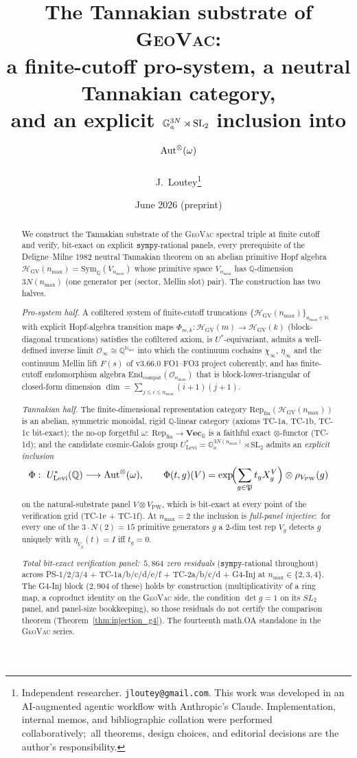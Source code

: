 \documentclass[11pt,a4paper]{article}
\title{The Tannakian substrate of \textsc{GeoVac}:\\
a finite-cutoff pro-system, a neutral Tannakian category,\\
and an explicit $\Ga^{3N} \rtimes \SL_{2}$ inclusion into $\Aut^{\otimes}(\fibfun)$}
\author{J.~Loutey\thanks{Independent researcher. \texttt{jloutey@gmail.com}.
This work was developed in an AI-augmented agentic workflow with
Anthropic's Claude. Implementation, internal memos, and bibliographic
collation were performed collaboratively;\ all theorems, design
choices, and editorial decisions are the author's responsibility.}}
\date{June 2026 (preprint)}
\theoremstyle{plain}
\theoremstyle{definition}
\newcommand{\nmax}{n_{\max}}
\newcommand{\HGV}{\mathcal{H}_{\mathrm{GV}}}
\newcommand{\Oh}{\mathcal{O}}
\newcommand{\Ginf}{\mathcal{O}_{\infty}}
\newcommand{\Repcat}{\mathrm{Rep}_{\mathrm{fin}}}
\newcommand{\Aut}{\mathrm{Aut}}
\newcommand{\End}{\mathrm{End}}
\newcommand{\Sym}{\mathrm{Sym}}
\newcommand{\SL}{\mathrm{SL}}
\newcommand{\Ga}{\mathbb{G}_{a}}
\newcommand{\Vecbf}{\mathbf{Vec}}
\newcommand{\Q}{\mathbb{Q}}
\newcommand{\N}{\mathbb{N}}
\newcommand{\Ulev}{U^{*}_{\mathrm{Levi}}}
\newcommand{\Ustar}{U^{*}}
\newcommand{\Phimap}{\Phi}
\newcommand{\fibfun}{\omega}
\begin{document}
\maketitle

\begin{abstract}
We construct the Tannakian substrate of the \textsc{GeoVac} spectral
triple at finite cutoff and verify, bit-exact on explicit
$\texttt{sympy}$-rational panels, every prerequisite of the Deligne--Milne
1982 neutral Tannakian theorem on an abelian primitive Hopf algebra
$\HGV(\nmax) = \Sym_{\Q}(V_{\nmax})$ whose primitive space $V_{\nmax}$
has $\Q$-dimension $3 N(\nmax)$ (one generator per (sector, Mellin slot)
pair). The construction has two halves.

\medskip
\noindent\emph{Pro-system half.} A cofiltered system of finite-cutoff
truncations $\{\HGV(\nmax)\}_{\nmax\in\N}$ with explicit Hopf-algebra
transition maps $\Phi_{m, k} : \HGV(m) \to \HGV(k)$ (block-diagonal
truncations) satisfies the cofiltered axiom, is $\Ustar$-equivariant,
admits a well-defined inverse limit $\Ginf \cong \Q^{\N_{\mathrm{sec}}}$
into which the continuum cochains $\chi_{\infty}$, $\eta_{\infty}$ and
the continuum Mellin lift $F(s)$ of v3.66.0 FO1--FO3 project
coherently, and has finite-cutoff endomorphism algebra
$\End_{\mathrm{compat}}(\Oh_{\nmax})$ that is block-lower-triangular of
closed-form dimension $\dim = \sum_{j \le i \le \nmax}(i + 1)(j + 1)$.

\medskip
\noindent\emph{Tannakian half.} The finite-dimensional
representation category $\Repcat(\HGV(\nmax))$ is an abelian, symmetric
monoidal, rigid $\Q$-linear category (axioms TC-1a, TC-1b, TC-1c
bit-exact); the no-op forgetful $\fibfun :\ \Repcat \to \Vecbf_{\Q}$ is a
faithful exact $\otimes$-functor (TC-1d); and the candidate
cosmic-Galois group $\Ulev = \Ga^{3 N(\nmax)} \rtimes \SL_{2}$
admits an \emph{explicit inclusion}
\[
   \Phimap :\ \Ulev(\Q) \longrightarrow \Aut^{\otimes}(\fibfun),
   \qquad
   \Phimap(t, g)(V) = \exp\!\Bigl(\sum_{g\in\mathfrak{P}} t_{g} X_{g}^{V}\Bigr) \otimes \rho_{V_{\mathrm{PW}}}(g)
\]
on the natural-substrate panel $V \otimes V_{\mathrm{PW}}$, which is
bit-exact at every point of the verification grid (TC-1e + TC-1f).
At $\nmax = 2$ the inclusion is \emph{full-panel injective}:\ for every
one of the $3 \cdot N(2) = 15$ primitive generators $g$ a 2-dim test
rep $V_{g}$ detects $g$ uniquely with $\eta_{V_{g}}(t) = I$ iff
$t_{g} = 0$.

\medskip
\noindent\emph{Total bit-exact verification panel:\ $5{,}864$ zero
residuals} ($\texttt{sympy}$-rational throughout) across PS-1/2/3/4 +
TC-1a/b/c/d/e/f + TC-2a/b/c/d + G4-Inj at $\nmax \in \{2, 3, 4\}$. The
G4-Inj block ($2{,}904$ of these) holds by construction (multiplicativity
of a ring map, a coproduct identity on the \textsc{GeoVac} side, the
condition $\det g = 1$ on its $SL_{2}$ panel, and panel-size bookkeeping),
so those residuals do not certify the comparison theorem
(Theorem~\ref{thm:injection_g4}).
The fourteenth math.OA standalone in the \textsc{GeoVac} series.


\end{abstract}
\end{document}

